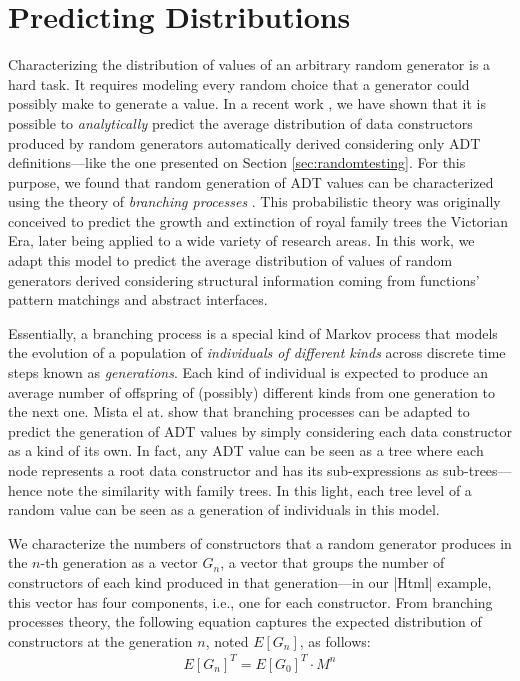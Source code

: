 \section{Predicting Distributions} \label{sec:synthesis}

Characterizing the distribution of values of an arbitrary random generator is a
hard task.
%
It requires modeling every random choice that a generator could possibly make to
generate a value.
%
In a recent work \cite{DBLP:conf/haskell/MistaRH18}, we have shown that it is
possible to \emph{analytically} predict the average distribution of data
constructors produced by random generators automatically derived considering
only ADT definitions---like the one presented on Section
\ref{sec:randomtesting}.
%
For this purpose, we found that random generation of ADT values can be
characterized using the theory of \emph{branching processes} \cite{gw1875}.
%
This probabilistic theory was originally conceived to predict the growth and
extinction of royal family trees the Victorian Era, later being applied to a
wide variety of research areas.
%
In this work, we adapt this model to predict the average distribution of values
of random generators derived considering structural information coming from
functions' pattern matchings and abstract interfaces.

Essentially, a branching process is a special kind of Markov process that models
the evolution of a population of \emph{individuals of different kinds} across
discrete time steps known as \emph{generations}.
%
Each kind of individual is expected to produce an average number of offspring of
(possibly) different kinds from one generation to the next one.
%
Mista el at. \cite{DBLP:conf/haskell/MistaRH18} show that branching processes
can be adapted to predict the generation of ADT values by simply considering
each data constructor as a kind of its own.
%
In fact, any ADT value can be seen as a tree where each node represents a root
data constructor and has its sub-expressions as sub-trees---hence note the
similarity with family trees.
%
In this light, each tree level of a random value can be seen as a generation of
individuals in this model.


We characterize the numbers of constructors that a random generator produces in
the $n$-th generation as a vector $G_n$, a vector that groups the number of
constructors of each kind produced in that generation---in our |Html| example,
this vector has four components, i.e., one for each constructor.
%
%
From branching processes theory, the following equation captures the expected
distribution of constructors at the generation $n$, noted $E[G_n]$, as follows:
%
\begin{align}
  E[G_n]^T = E[G_0]^T \cdot M^n
  \label{eqn:prediction}
\end{align}

